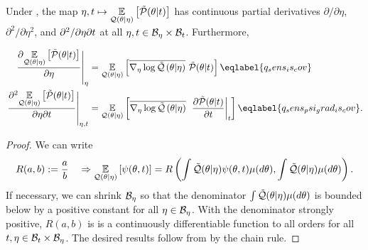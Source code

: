 
\begin{lem}

Under , the map $\eta, t \mapsto \underset{\mathcal{Q}(\theta
\vert \eta)}{\mathbb{E}}\left[\tilde{\mathcal{P}}(\theta \vert t)\right]$ has continuous partial derivatives
$\partial / \partial \eta$, $\partial^2 / \partial \eta^2$, and $\partial^2 /
\partial \eta \partial t$ at all $\eta, t \in \mathcal{B}_\eta \times \mathcal{B}_t$.
Furthermore,

\begin{align}
\fracat{\partial \expect{\q(\theta \vert \eta)}
              {\ptil(\theta \vert \t)}}{\partial \eta}{\eta}
={}&
\expect{\q(\theta \vert \eta)}
       {\lqgradbar{\theta \vert \eta}
       \ptil(\theta \vert \t)}
       \eqlabel{q_sens_is_cov}\\
%
\fracat{\partial^2 \expect{\q(\theta \vert \eta)}
      {\ptil(\theta \vert \t)}}{\partial \eta \partial \t}{\eta, \t}
={}&
\expect{\q(\theta \vert \eta)}
       {\lqgradbar{\theta \vert \eta}
       \fracat{\partial \ptil(\theta \vert \t)}{\partial \t}{\t}}
\eqlabel{q_sens_psi_grad_is_cov}.
%
\end{align}
%
\begin{proof}
%
We can write
%
\begin{align*}
%
R(a, b) :={} \frac{a}{b} \quad \Rightarrow
\expect{\q(\theta \vert \eta)}{\psi(\theta, \t)} ={}
R\left(\int \qtil(\theta \vert \eta) \psi(\theta, \t) \mu(d\theta),
  \int \qtil(\theta \vert \eta) \mu(d\theta)\right).
%
\end{align*}
%
If necessary, we can shrink $\mathcal{B}_\eta$ so that the denominator $\int
\tilde{\mathcal{Q}}(\theta \vert \eta) \mu(d\theta)$ is bounded below by a positive constant
for all $\eta \in \mathcal{B}_\eta$.  With the denominator strongly positive, $R(a,b)$
is is a continuously differentiable function to all orders for all $t, \eta \in
\mathcal{B}_t \times \mathcal{B}_\eta$.  The desired results follow from
 by the chain rule.

\end{proof}
%
\end{lem}




